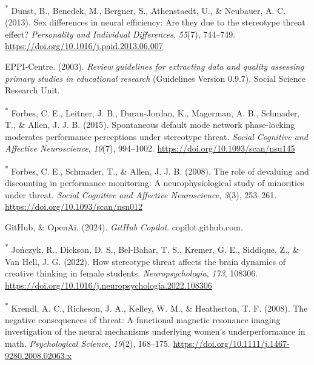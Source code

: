 \documentclass[
  stu]{apa7}
\newlength{\cslhangindent}
\newenvironment{CSLReferences}[2] %
 {\begin{list}{}{%
  \setlength{\itemindent}{0pt}
  \setlength{\leftmargin}{0pt}
  \setlength{\parsep}{0pt}
  \ifodd #1
   \setlength{\leftmargin}{\cslhangindent}
   \setlength{\itemindent}{-1\cslhangindent}
  \fi
  \setlength{\itemsep}{#2\baselineskip}}}
 {\end{list}}
\begin{document}
\begin{CSLReferences}{1}{0}
\textsuperscript{*} Dunst, B., Benedek, M., Bergner, S., Athenstaedt, U., \& Neubauer, A. C. (2013). Sex differences in neural efficiency: {Are} they due to the stereotype threat effect? \emph{Personality and Individual Differences}, \emph{55}(7), 744--749. \url{https://doi.org/10.1016/j.paid.2013.06.007}

EPPI-Centre. (2003). \emph{Review guidelines for extracting data and quality assessing primary studies in educational research} (Guidelines Version 0.9.7). Social Science Research Unit.

\textsuperscript{*} Forbes, C. E., Leitner, J. B., Duran-Jordan, K., Magerman, A. B., Schmader, T., \& Allen, J. J. B. (2015). Spontaneous default mode network phase-locking moderates performance perceptions under stereotype threat. \emph{Social Cognitive and Affective Neuroscience}, \emph{10}(7), 994--1002. \url{https://doi.org/10.1093/scan/nsu145}

\textsuperscript{*} Forbes, C. E., Schmader, T., \& Allen, J. J. B. (2008). The role of devaluing and discounting in performance monitoring: A neurophysiological study of minorities under threat. \emph{Social Cognitive and Affective Neuroscience}, \emph{3}(3), 253--261. \url{https://doi.org/10.1093/scan/nsn012}

GitHub, \& OpenAi. (2024). \emph{{GitHub Copilot}}. copilot.github.com.

\textsuperscript{*} Jończyk, R., Dickson, D. S., Bel-Bahar, T. S., Kremer, G. E., Siddique, Z., \& Van Hell, J. G. (2022). How stereotype threat affects the brain dynamics of creative thinking in female students. \emph{Neuropsychologia}, \emph{173}, 108306. \url{https://doi.org/10.1016/j.neuropsychologia.2022.108306}

\textsuperscript{*} Krendl, A. C., Richeson, J. A., Kelley, W. M., \& Heatherton, T. F. (2008). The negative consequences of threat: A functional magnetic resonance imaging investigation of the neural mechanisms underlying women's underperformance in math. \emph{Psychological Science}, \emph{19}(2), 168--175. \url{https://doi.org/10.1111/j.1467-9280.2008.02063.x}


\end{CSLReferences}
\end{document}
